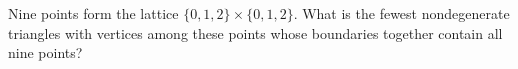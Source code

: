Nine points form the lattice $\{0,1,2\}\times\{0,1,2\}$. What is the fewest nondegenerate triangles with vertices among these points whose boundaries together contain all nine points?
